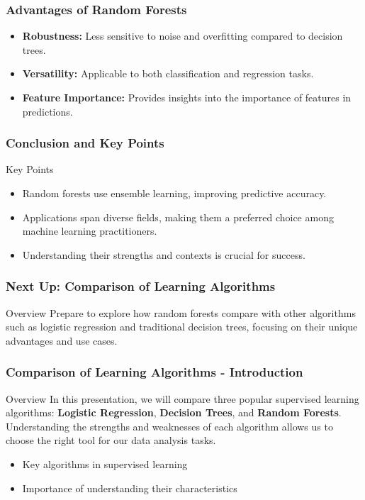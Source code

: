 \documentclass[aspectratio=169]{beamer}
\begin{document}
\begin{frame}[fragile]
    \frametitle{Advantages of Random Forests}
    \begin{itemize}
        \item \textbf{Robustness:} Less sensitive to noise and overfitting compared to decision trees.
        \item \textbf{Versatility:} Applicable to both classification and regression tasks.
        \item \textbf{Feature Importance:} Provides insights into the importance of features in predictions.
    \end{itemize}
\end{frame}

\begin{frame}[fragile]
    \frametitle{Conclusion and Key Points}
    \begin{block}{Key Points}
        \begin{itemize}
            \item Random forests use ensemble learning, improving predictive accuracy.
            \item Applications span diverse fields, making them a preferred choice among machine learning practitioners.
            \item Understanding their strengths and contexts is crucial for success.
        \end{itemize}
    \end{block}
\end{frame}

\begin{frame}[fragile]
    \frametitle{Next Up: Comparison of Learning Algorithms}
    \begin{block}{Overview}
        Prepare to explore how random forests compare with other algorithms 
        such as logistic regression and traditional decision trees, focusing on their unique advantages and use cases.
    \end{block}
\end{frame}

\begin{frame}[fragile]
    \frametitle{Comparison of Learning Algorithms - Introduction}
    \begin{block}{Overview}
        In this presentation, we will compare three popular supervised learning algorithms: 
        \textbf{Logistic Regression}, \textbf{Decision Trees}, and \textbf{Random Forests}. 
        Understanding the strengths and weaknesses of each algorithm allows us to choose the right tool for our data analysis tasks.
    \end{block}
    \begin{itemize}
        \item Key algorithms in supervised learning
        \item Importance of understanding their characteristics
    \end{itemize}
\end{frame}
\end{document}
